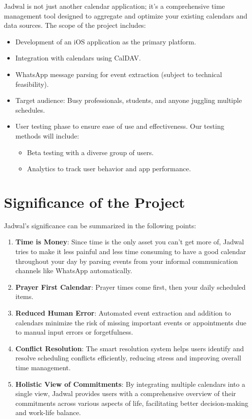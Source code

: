 \documentclass[12pt,a4paper]{report}
\begin{document}
Jadwal is not just another calendar application; it's a comprehensive time management tool designed to aggregate and optimize your existing calendars and data sources. The scope of the project includes:
\begin{itemize}
    \item Development of an iOS application as the primary platform.
    \item Integration with calendars using CalDAV.
    \item WhatsApp message parsing for event extraction (subject to technical feasibility).
    \item Target audience: Busy professionals, students, and anyone juggling multiple schedules.
    \item User testing phase to ensure ease of use and effectiveness. Our testing methods will include:
    \begin{itemize}
            \item Beta testing with a diverse group of users.
            \item Analytics to track user behavior and app performance.
        \end{itemize}
\end{itemize}



\section{Significance of the Project}

Jadwal's significance can be summarized in the following points:
\begin{enumerate}
    \item \textbf{Time is Money}: Since time is the only asset you can't get more of, Jadwal tries to make it less painful and less time consuming to have a good calendar throughout your day by parsing events from your informal communication channels like WhatsApp automatically.
    \item \textbf{Prayer First Calendar}: Prayer times come first, then your daily scheduled items.
    \item \textbf{Reduced Human Error}: Automated event extraction and addition to calendars minimize the risk of missing important events or appointments due to manual input errors or forgetfulness.
    \item \textbf{Conflict Resolution}: The smart resolution system helps users identify and resolve scheduling conflicts efficiently, reducing stress and improving overall time management.
    \item \textbf{Holistic View of Commitments}: By integrating multiple calendars into a single view, Jadwal provides users with a comprehensive overview of their commitments across various aspects of life, facilitating better decision-making and work-life balance.
\end{enumerate}
\end{document}
